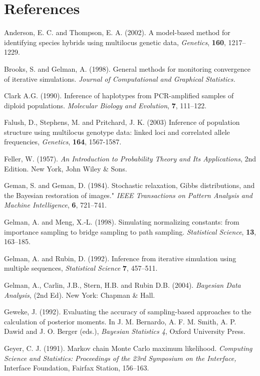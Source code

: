 
\section*{References}


Anderson, E. C. and Thompson, E. A. (2002). A model-based method for identifying species hybrids using multilocus genetic data, {\em Genetics}, {\bf 160}, 1217--1229.



Brooks, S. and Gelman, A.  (1998). General methods for monitoring convergence
of iterative simulations.  {\em Journal of Computational and Graphical
Statistics.}


Clark A.G. (1990). Inference of haplotypes from PCR-amplified
samples of diploid populations. {\em Molecular Biology and Evolution}, {\bf 7}, 111--122.


Falush, D., Stephens, M. and Pritchard, J. K. (2003)
Inference of population structure using multilocus genotype data: linked loci and correlated allele frequencies,
  {\em Genetics},
{\bf 164},
1567-1587.






Feller, W. (1957). {\em An Introduction to Probability Theory and Its Applications}, 2nd Edition. New York, John Wiley \& Sons.

Geman, S. and Geman, D. (1984). Stochastic relaxation, Gibbs distributions, and the Bayesian restoration of images." {\em IEEE Transactions on Pattern Analysis and Machine Intelligence}, {\bf 6}, 721--741.

Gelman, A. and Meng, X.-L. (1998). Simulating normalizing constants: from importance sampling to bridge sampling to path sampling.  {\em Statistical Science}, {\bf 13}, 163--185.

Gelman, A. and Rubin, D.  (1992).  Inference from iterative simulation using
multiple sequences,  {\em Statistical Science} {\bf 7}, 457--511.

Gelman, A., Carlin, J.B., Stern, H.B. and Rubin D.B.  (2004).  {\em Bayesian
Data Analysis}, (2nd  Ed).  New York:  Chapman \& Hall.

Geweke, J.  (1992). Evaluating the accuracy of sampling-based approaches to
the calculation of posterior moments.  In J. M. Bernardo, A. F. M. Smith, A.
P. Dawid and J. O. Berger (eds.), {\em Bayesian Statistics 4}, Oxford
University Press.

Geyer, C. J. (1991). Markov chain Monte Carlo maximum likelihood. {\em Computing Science and Statistics: Proceedings of the 23rd Symposium on the   Interface,}  Interface Foundation, Fairfax Station, 156--163.


